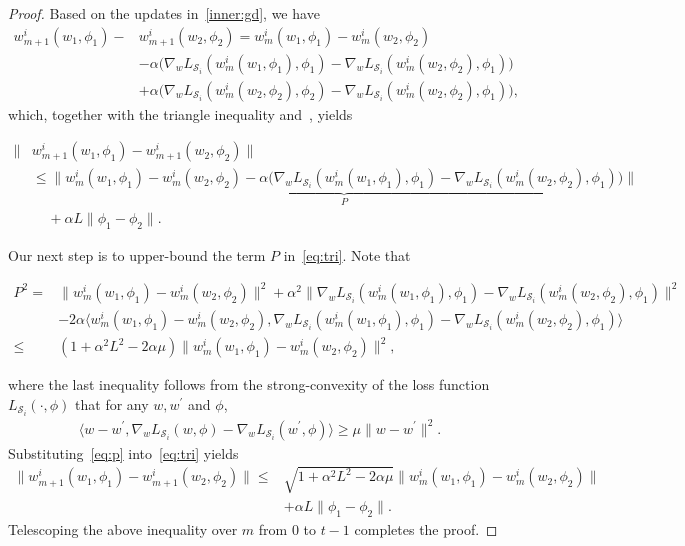\documentclass{osudissert96}
\begin{document}
\begin{proof}
Based on the updates in~\cref{inner:gd}, we have 
\begin{align}
w_{m+1}^i(w_1,\phi_1)-&w_{m+1}^i(w_2,\phi_2) = w_{m}^i(w_1,\phi_1)-w_{m}^i(w_2,\phi_2)  \nonumber
\\&-\alpha \big(\nabla_w L_{\mathcal{S}_i}(w_m^i(w_1,\phi_1),\phi_1)-\nabla_w L_{\mathcal{S}_i}(w_m^i(w_2,\phi_2),\phi_1)\big)  \nonumber
\\&+ \alpha \big(\nabla_w L_{\mathcal{S}_i}(w_m^i(w_2,\phi_2),\phi_2)-\nabla_w L_{\mathcal{S}_i}(w_m^i(w_2,\phi_2),\phi_1)\big),\nonumber
\end{align}
which, together with the triangle inequality and~, yields
\begin{small}
\begin{align}\label{eq:tri}
\|&w_{m+1}^i(w_1,\phi_1)-w_{m+1}^i(w_2,\phi_2) \|
\nonumber
\\&\leq \underbrace{\Big\|w_{m}^i(w_1,\phi_1)-w_{m}^i(w_2,\phi_2) -\alpha \big(\nabla_w L_{\mathcal{S}_i}(w_m^i(w_1,\phi_1),\phi_1)-\nabla_w L_{\mathcal{S}_i}(w_m^i(w_2,\phi_2),\phi_1)\big)\Big\|}_{P}  \nonumber
\\&\;\;\;\;+ \alpha L\|\phi_1-\phi_2\|.
\end{align} 
\end{small}
\hspace{-0.12cm}Our next step is to upper-bound the term $P$ in~\cref{eq:tri}. Note that 
\begin{small}
\begin{align}\label{eq:p}
P^2 =& \|w_{m}^i(w_1,\phi_1)-w_{m}^i(w_2,\phi_2) \|^2 + \alpha^2\|\nabla_w L_{\mathcal{S}_i}(w_m^i(w_1,\phi_1),\phi_1)-\nabla_w L_{\mathcal{S}_i}(w_m^i(w_2,\phi_2),\phi_1)\|^2 \nonumber
\\&-2\alpha \Big\langle w_{m}^i(w_1,\phi_1)-w_{m}^i(w_2,\phi_2),  \nabla_w L_{\mathcal{S}_i}(w_m^i(w_1,\phi_1),\phi_1)-\nabla_w L_{\mathcal{S}_i}(w_m^i(w_2,\phi_2),\phi_1)  \Big\rangle \nonumber
\\\leq& (1+\alpha^2L^2-2\alpha\mu) \|w_{m}^i(w_1,\phi_1)-w_{m}^i(w_2,\phi_2) \|^2, 
\end{align}
\end{small}
\hspace{-0.12cm} where the last inequality follows from the strong-convexity of the loss function $L_{\mathcal{S}_i}(\cdot,\phi)$ that for any $w,w^\prime$ and $\phi$,
\begin{align*}
\langle w - w^\prime, \nabla_w L_{\mathcal{S}_i}(w,\phi) - \nabla_w L_{\mathcal{S}_i}(w^\prime,\phi)\rangle \geq  \mu \|w-w^\prime\|^2.
\end{align*}
Substituting~\cref{eq:p} into~\cref{eq:tri} yields  
\begin{align}
\|w_{m+1}^i(w_1,\phi_1)-w_{m+1}^i(w_2,\phi_2) \|\leq& \sqrt{1+\alpha^2L^2-2\alpha\mu}\|w_{m} ^i(w_1,\phi_1)-w_{m}^i(w_2,\phi_2) \| \nonumber
\\&+ \alpha L\|\phi_1-\phi_2\|.
\end{align}
Telescoping the above inequality over $m$ from $0$ to $t-1$ completes the proof.
\end{proof}
\end{document}
